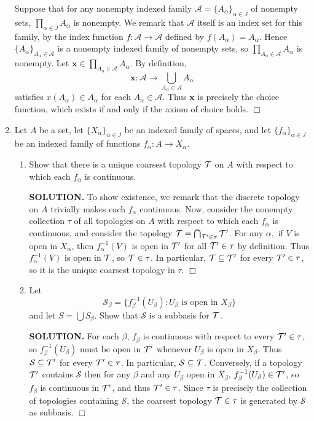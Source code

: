 \documentclass{article}
\begin{document}
\begin{enumerate}
    Suppose that for any nonempty indexed family $\mathcal{A} = \{A_\alpha\}_{\alpha \in J}$ of nonempty sets, $\prod_{\alpha \in J} A_\alpha$ is nonempty. We remark that $\mathcal{A}$ itself is an index set for this family, by the index function $f: \mathcal{A} \rightarrow \mathcal{A}$ defined by $f(A_\alpha) = A_\alpha$. Hence $\{A_\alpha\}_{A_\alpha \in \mathcal{A}}$ is a nonempty indexed family of nonempty sets, so $\prod_{A_\alpha \in \mathcal{A}} A_\alpha$ is nonempty. Let $\mathbf{x} \in \prod_{A_\alpha \in \mathcal{A}} A_\alpha$. By definition,
    $$\mathbf{x}: \mathcal{A} \rightarrow \bigcup_{A_\alpha \in \mathcal{A}} A_\alpha$$
    satisfies $x(A_\alpha) \in A_\alpha$ for each $A_\alpha \in \mathcal{A}$. Thus $\mathbf{x}$ is precisely the choice function, which exists if and only if the axiom of choice holds. $\Box$

    \item Let $A$ be a set, let $\{X_\alpha\}_{\alpha \in J}$ be an indexed family of spaces, and let $\{f_\alpha\}_{\alpha \in J}$ be an indexed family of functions $f_\alpha: A \rightarrow X_\alpha$.
    \begin{enumerate}
        \item Show that there is a unique coarsest topology $\mathcal{T}$ on $A$ with respect to which each $f_\alpha$ is continuous.

        {\bf SOLUTION.} To show existence, we remark that the discrete topology on $A$ trivially makes each $f_\alpha$ continuous. Now, consider the nonempty collection $\tau$ of all topologies on $A$ with respect to which each $f_\alpha$ is continuous, and consider the topology $\mathcal{T} = \bigcap_{\mathcal{T}' \in \tau} \mathcal{T}'$. For any $\alpha,$ if $V$ is open in $X_\alpha$, then $f_\alpha^{-1}(V)$ is open in $\mathcal{T}'$ for all $\mathcal{T}' \in \tau$ by definition. Thus $f_\alpha^{-1}(V)$ is open in $\mathcal{T}$, so $\mathcal{T} \in \tau$. In particular, $\mathcal{T} \subseteq \mathcal{T}'$ for every $\mathcal{T}' \in \tau$, so it is the unique coarsest topology in $\tau$. $\Box$

        \item Let
        $$\mathcal{S}_\beta = \{f^{-1}_\beta(U_\beta): U_\beta \text{ is open in } X_\beta\}$$
        and let $S = \bigcup S_\beta$. Show that $\mathcal{S}$ is a subbasis for $\mathcal{T}$.

        {\bf SOLUTION.} For each $\beta$, $f_\beta$ is continuous with respect to every $\mathcal{T}' \in \tau$, so $f^{-1}_\beta(U_\beta)$ must be open in $\mathcal{T}'$ whenever $U_\beta$ is open in $X_\beta$. Thus $\mathcal{S} \subseteq \mathcal{T}'$ for every $\mathcal{T}' \in \tau$. In particular, $\mathcal{S} \subseteq \mathcal{T}$. Conversely, if a topology $\mathcal{T}'$ contains $\mathcal{S}$ then for any $\beta$ and any $U_\beta$ open in $X_\beta$, $f_\beta^{-1}(U_\beta) \in \mathcal{T}'$, so $f_\beta$ is continuous in $\mathcal{T}'$, and thus $\mathcal{T}' \in \tau$. Since $\tau$ is precisely the collection of topologies containing $\mathcal{S}$, the coarsest topology $\mathcal{T} \in \tau$ is generated by $\mathcal{S}$ as subbasis. $\Box$


\end{enumerate}
\end{enumerate}
\end{document}
